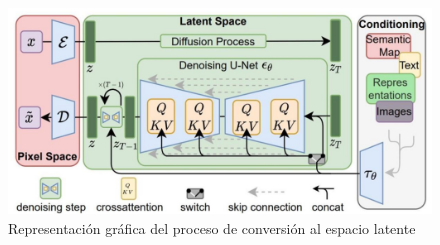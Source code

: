 \begin{figure}[h]
	\centering
	\includegraphics[width = 1
	\textwidth]{Imagenes/Vectorial/espaciolatente.png}
	\caption{Representación gráfica del proceso de conversión al espacio latente \citep{rombach2022high}}
	\label{fig:latentspace}
\end{figure}

